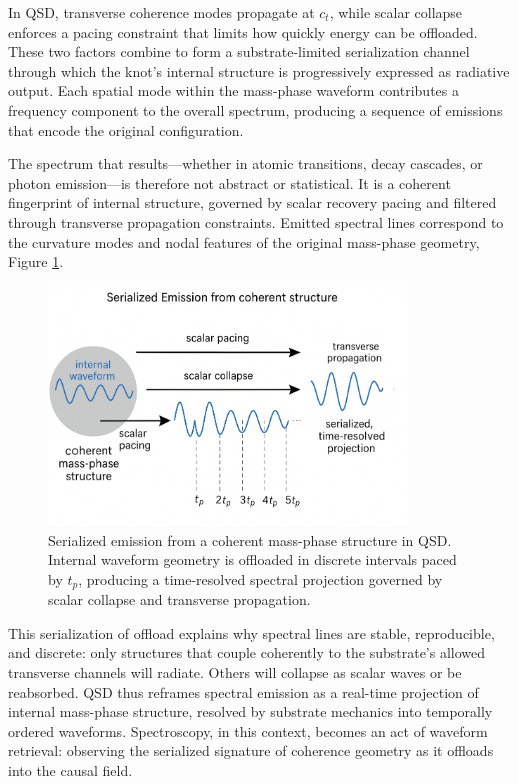 \documentclass[entropy,article,submit,pdftex,oneauthor]{Definitions/mdpi}
\begin{document}
In QSD, transverse coherence modes propagate at \texorpdfstring{\( c_t \)}{ct}, while scalar collapse enforces a pacing constraint that limits how quickly energy can be offloaded. These two factors combine to form a substrate-limited serialization channel through which the knot's internal structure is progressively expressed as radiative output. Each spatial mode within the mass-phase waveform contributes a frequency component to the overall spectrum, producing a sequence of emissions that encode the original configuration.

The spectrum that results—whether in atomic transitions, decay cascades, or photon emission—is therefore not abstract or statistical. It is a coherent fingerprint of internal structure, governed by scalar recovery pacing and filtered through transverse propagation constraints. Emitted spectral lines correspond to the curvature modes and nodal features of the original mass-phase geometry, Figure \ref{fig:spectral}.

\begin{figure}[htbp]
\centering
\includegraphics[width=0.85\textwidth]{figures/spectral.pdf}
\caption{Serialized emission from a coherent mass-phase structure in QSD. Internal waveform geometry is offloaded in discrete intervals paced by \( t_p \), producing a time-resolved spectral projection governed by scalar collapse and transverse propagation.}

\label{fig:spectral}
\end{figure}

This serialization of offload explains why spectral lines are stable, reproducible, and discrete: only structures that couple coherently to the substrate’s allowed transverse channels will radiate. Others will collapse as scalar waves or be reabsorbed. QSD thus reframes spectral emission as a real-time projection of internal mass-phase structure, resolved by substrate mechanics into temporally ordered waveforms. Spectroscopy, in this context, becomes an act of waveform retrieval: observing the serialized signature of coherence geometry as it offloads into the causal field.
\end{document}
